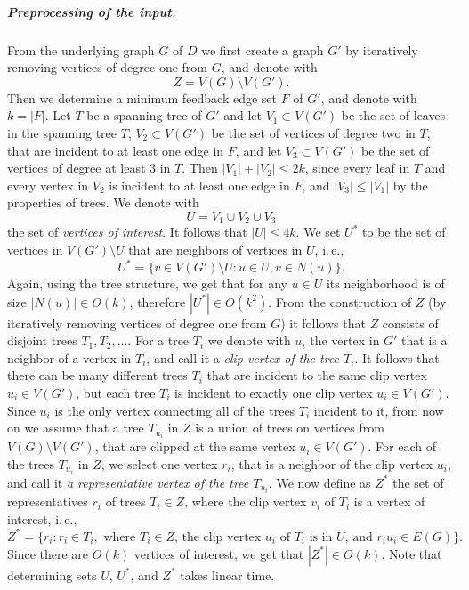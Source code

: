 \documentclass[a4paper,UKenglish,cleveref, autoref, thm-restate,anonymous]{lipics-v2021}
\newcommand{\ie}{i.\,e.,\ }
\begin{document}
\subparagraph{Preprocessing of the input.}
From the underlying graph $G$ of $D$ we first create a graph $G'$ by
iteratively removing vertices of degree one from $G$,
and denote with 
\[
Z = V(G) \setminus V(G').
\]
Then we determine a minimum feedback edge set $F$ of $G'$, and denote with $k = |F|$.
Let $T$ be a spanning tree of $G'$ and
let $V_1 \subset V(G')$ be the set of leaves in the spanning tree $T$, $V_2 \subset V(G')$ be the set of vertices of degree two in $T$, that are incident to at least one edge in $F$, 
and let $V_3 \subset V(G')$ be the set of vertices of degree at least $3$ in $T$. 
Then $|V_1| + |V_2| \leq 2k$, since every leaf in $T$ and every vertex in $V_2$ is incident to at least one edge in $F$,
and $|V_3| \leq |V_1|$ by the properties of trees.
We denote with 
\[U = V_1 \cup V_2 \cup V_3\]
the set of \emph{vertices of interest}. It follows that $|U| \leq 4k$.
We set $U^*$ to be the set of vertices in $V(G') \setminus U$ that are neighbors of vertices in $U$, \ie 
\[U^* = \{v \in V(G') \setminus U  :  u \in U, v \in N(u)\}.\]
Again, using the tree structure, we get that for any $u \in U$ its neighborhood is of size $|N(u)| \in O(k)$, therefore $|U^*| \in O(k^2)$.
From the construction of $Z$ (by iteratively removing vertices of degree one from $G$)
it follows that $Z$ consists of disjoint trees $T_1, T_2, \dots$.
For a tree $T_i$ we denote with $u_i$ the vertex in $G'$ that is a neighbor of a vertex in $T_i$, 
and call it a \emph{clip vertex of the tree $T_i$}.
It follows that there can be many different trees $T_i$ that are incident to the same clip vertex $u_i \in V(G')$,
but each tree $T_i$ is incident to exactly one clip vertex $u_i \in V(G')$.
Since $u_i$ is the only vertex connecting all of the trees $T_i$ incident to it,
from now on we assume that a tree $T_{u_i}$ in $Z$ is a union of trees on vertices from $V(G) \setminus V(G')$,
that are clipped at the same vertex $u_i \in V(G')$.
For each of the trees $T_{u_i}$ in $Z$, we select one vertex $r_i$, that is a neighbor of the clip vertex $u_i$,
and call it \emph{a representative vertex of the tree $T_{u_i}$}.
We now define as $Z^*$ the set of representatives $r_i$ of trees $T_i \in Z$,
where the clip vertex $v_i$ of $T_i$ is a vertex of interest, \ie
\[
Z^* = \{ r_i  :  r_i \in T_i, \text{ where $T_i \in Z$, the clip vertex $u_i$ of $T_i$ is in $U$, and $r_i u_i \in E(G)$}\}.
\]
Since there are $O(k)$ vertices of interest, we get that $|Z^*| \in O(k)$.
Note that determining sets $U$, $U^*$, and $Z^*$ takes linear time. 
\end{document}
